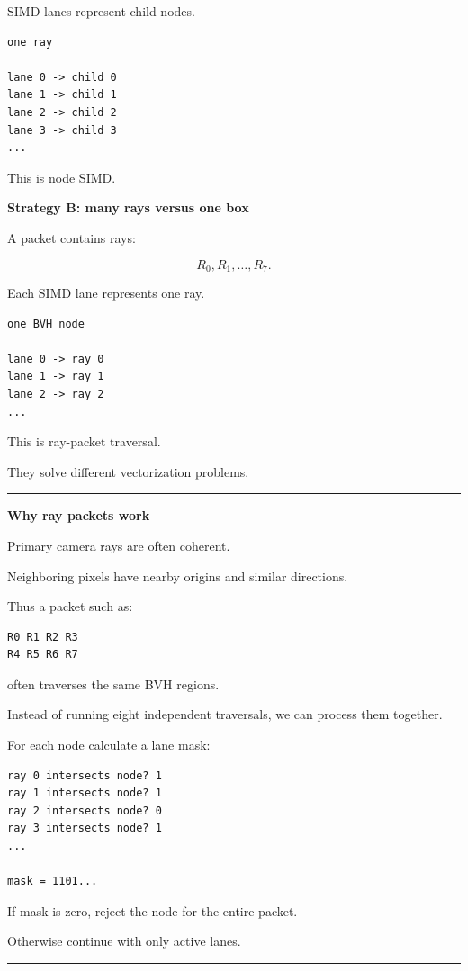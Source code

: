 SIMD lanes represent child nodes.

\begin{verbatim}
one ray

lane 0 -> child 0
lane 1 -> child 1
lane 2 -> child 2
lane 3 -> child 3
...
\end{verbatim}

This is node SIMD.

\textbf{Strategy B: many rays versus one box}

A packet contains rays:

\[
R_0,R_1,\ldots,R_7.
\]

Each SIMD lane represents one ray.

\begin{verbatim}
one BVH node

lane 0 -> ray 0
lane 1 -> ray 1
lane 2 -> ray 2
...
\end{verbatim}

This is ray-packet traversal.

They solve different vectorization problems.

\begin{center}\rule{0.5\linewidth}{0.5pt}\end{center}

\textbf{Why ray packets work}

Primary camera rays are often coherent.

Neighboring pixels have nearby origins and similar directions.

Thus a packet such as:

\begin{verbatim}
R0 R1 R2 R3
R4 R5 R6 R7
\end{verbatim}

often traverses the same BVH regions.

Instead of running eight independent traversals, we can process them together.

For each node calculate a lane mask:

\begin{verbatim}
ray 0 intersects node? 1
ray 1 intersects node? 1
ray 2 intersects node? 0
ray 3 intersects node? 1
...

mask = 1101...
\end{verbatim}

If mask is zero, reject the node for the entire packet.

Otherwise continue with only active lanes.

\begin{center}\rule{0.5\linewidth}{0.5pt}\end{center}

